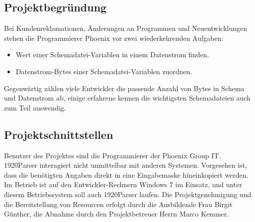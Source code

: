 \subsection{Projektbegründung}
\label{sec:Projektbegruendung}
Bei Kundenreklamationen, Änderungen an Programmen und Neuentwicklungen stehen die
Programmierer Phoenix vor zwei wiederkehrenden Aufgaben:

\begin{itemize}
\item Wert einer Schemadatei-Variablen in einem Datenstrom finden.
\item Datenstrom-Bytes einer Schemadatei-Variablen zuordnen.
\end{itemize}

Gegenwärtig zählen viele Entwickler die passende Anzahl von Bytes in Schema und Datenstrom ab, einige erfahrene kennen die wichtigsten Schemadateien auch zum Teil auswendig.



\subsection{Projektschnittstellen}
\label{sec:Projektschnittstellen}
Benutzer des Projektes sind die Programmierer der Phoenix Group IT.
1920Parser interagiert nicht unmittelbar mit anderen Systemen. Vorgesehen ist, dass die benötigten Angaben direkt in eine Eingabemaske hineinkopiert werden. Im Betrieb ist auf den Entwickler-Rechnern Windows 7 im Einsatz, und unter diesem Betriebssystem soll auch 1920Parser laufen.
Die Projektgenehmigung und die Bereitstellung von Resourcen erfolgt durch die Ausbildende Frau Birgit Günther, die Abnahme durch den Projektbetreuer Herrn Marco Kemmer.

